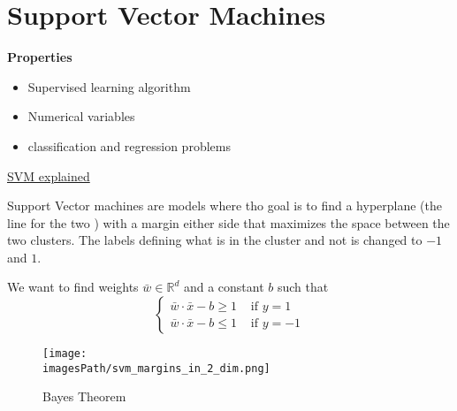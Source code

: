 \documentclass{article}
\newcommand{\imagesPath}{images}
\begin{document}


\newpage
\section{Support Vector Machines}
\textbf{Properties}
\begin{itemize}
    \item Supervised learning algorithm
    \item Numerical variables 
    \item classification and regression problems
\end{itemize}
\href{https://www.youtube.com/watch?v=efR1C6CvhmE}{SVM explained}

Support Vector machines are models where tho goal is to find a hyperplane (the line for the two ) with a 
margin either side that maximizes the space between the two clusters.
The labels defining what is in the cluster and not is changed to $-1$ and $1$.

We want to find weights $\bar{w} \in \mathbb{R}^d$ and a constant $b$ such that
\begin{equation*}
    \begin{cases}
        \bar{w} \cdot \bar{x} -b \geq 1 & \text{ if } y=1 \\
        \bar{w} \cdot \bar{x} -b \leq 1 & \text{ if } y=-1
    \end{cases}
\end{equation*}


\begin{figure}[!h]
    \centering
    \texttt{[image: \\imagesPath/svm\_margins\_in\_2\_dim.png]}
    \caption{Bayes Theorem}
\end{figure}
\end{document}
